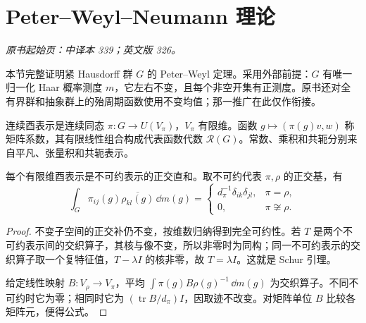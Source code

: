 \section{Peter--Weyl--Neumann 理论}\label{sec:yosida-11-10}
\noindent\textit{原书起始页：中译本 339；英文版 326。}

本节完整证明紧 Hausdorff 群 $G$ 的 Peter--Weyl 定理。采用外部前提：$G$ 有唯一归一化 Haar 概率测度 $m$，它左右不变，且每个非空开集有正测度。原书还对全有界群和抽象群上的殆周期函数使用不变均值；那一推广在此仅作衔接。

\begin{definition}[有限维表示与矩阵系数]
连续酉表示是连续同态 $\pi:G\to U(V_\pi)$，$V_\pi$ 有限维。函数 $g\mapsto(\pi(g)v,w)$ 称矩阵系数，其有限线性组合构成代表函数代数 $\mathcal R(G)$。常数、乘积和共轭分别来自平凡、张量积和共轭表示。
\end{definition}

\begin{lemma}\label{lem:y11-schur}
每个有限维酉表示是不可约表示的正交直和。取不可约代表 $\pi,\rho$ 的正交基，有
\[
 \int_G\pi_{ij}(g)\overline{\rho_{kl}(g)}\,\dd m(g)
 =\begin{cases}d_\pi^{-1}\delta_{ik}\delta_{jl},&\pi=\rho,\\0,&\pi\not\cong\rho.\end{cases}
\]
\end{lemma}
\begin{proof}
不变子空间的正交补仍不变，按维数归纳得到完全可约性。若 $T$ 是两个不可约表示间的交织算子，其核与像不变，所以非零时为同构；同一不可约表示的交织算子取一个复特征值，$T-\lambda I$ 的核非零，故 $T=\lambda I$。这就是 Schur 引理。

给定线性映射 $B:V_\rho\to V_\pi$，平均 $\int\pi(g)B\rho(g)^{-1}\,\dd m(g)$ 为交织算子。不同不可约时它为零；相同时它为 $(\operatorname{tr}B/d_\pi)I$，因取迹不改变。对矩阵单位 $B$ 比较各矩阵元，便得公式。
\end{proof}


